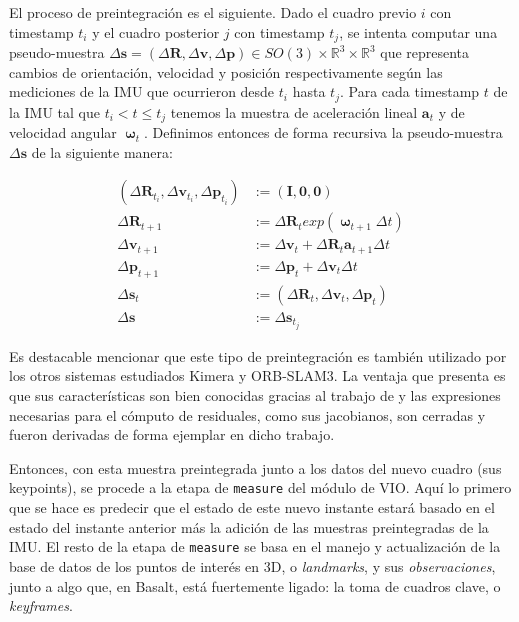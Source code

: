 \documentclass[ twoside,openright,titlepage,numbers=noenddot,%
                headinclude,footinclude,cleardoublepage=empty,abstract=on,
                BCOR=-5mm,paper=a4,fontsize=11pt
                ]{scrreprt}
\newcommand{\R}{\mathbb{R}}
\newcommand{\passthrough}[1]{#1}
\begin{document}
El proceso de preintegración es el siguiente. Dado el cuadro previo
\(i\) con timestamp \(t_i\) y el cuadro posterior \(j\) con timestamp
\(t_j\), se intenta computar una pseudo-muestra
\(\Delta \mathbf{s} = (\Delta \mathbf{R}, \Delta \mathbf{v}, \Delta \mathbf{p}) \in SO(3) \times \R^3 \times \R^3\)
que representa cambios de orientación, velocidad y posición
respectivamente según las mediciones de la IMU que ocurrieron desde
\(t_i\) hasta \(t_j\). Para cada timestamp \(t\) de la IMU tal que
\(t_i < t \leq t_j\) tenemos la muestra de aceleración lineal
\(\mathbf{a}_t\) y de velocidad angular \(\mathbf{\upomega}_t\).
Definimos entonces de forma recursiva la pseudo-muestra
\(\Delta \mathbf{s}\) de la siguiente manera:

\begin{align}
\label{eq:imu-preintegration}
(\Delta \mathbf{R}_{t_i}, \Delta \mathbf{v}_{t_i}, \Delta
\mathbf{p}_{t_i}) & := (\mathbf{I}, \mathbf{0}, \mathbf{0})
\\
\Delta \mathbf{R}_{t+1} & := \Delta \mathbf{R}_t exp(\mathbf{\upomega}_{t+1} \Delta t)
\\
\Delta \mathbf{v}_{t+1} & := \Delta \mathbf{v}_t + \Delta{\mathbf{R}_t}
\mathbf{a}_{t+1} \Delta t
\\
\Delta \mathbf{p}_{t+1} & := \Delta \mathbf{p}_t + \Delta \mathbf{v}_t \Delta t
\\
\Delta \mathbf{s}_{t} & := (\Delta \mathbf{R}_{t}, \Delta \mathbf{v}_{t}, \Delta
\mathbf{p}_{t})
\\
\Delta \mathbf{s} & := \Delta \mathbf{s}_{t_j}
\end{align}

Es destacable mencionar que este tipo de preintegración es también
utilizado por los otros sistemas estudiados Kimera y ORB-SLAM3. La
ventaja que presenta es que sus características son bien conocidas
gracias al trabajo de
\textcite{forsterOnManifoldPreintegrationRealTime2017} y las expresiones
necesarias para el cómputo de residuales, como sus jacobianos, son
cerradas y fueron derivadas de forma ejemplar en dicho trabajo.

Entonces, con esta muestra preintegrada junto a los datos del nuevo
cuadro (sus keypoints), se procede a la etapa de
\passthrough{\lstinline!measure!} del módulo de VIO. Aquí lo primero que
se hace es predecir que el estado de este nuevo instante estará basado
en el estado del instante anterior más la adición de las muestras
preintegradas de la IMU. El resto de la etapa de
\passthrough{\lstinline!measure!} se basa en el manejo y actualización
de la base de datos de los puntos de interés en 3D, o \emph{landmarks},
y sus \emph{observaciones}, junto a algo que, en Basalt, está
fuertemente ligado: la toma de cuadros clave, o \emph{keyframes}.
\end{document}
